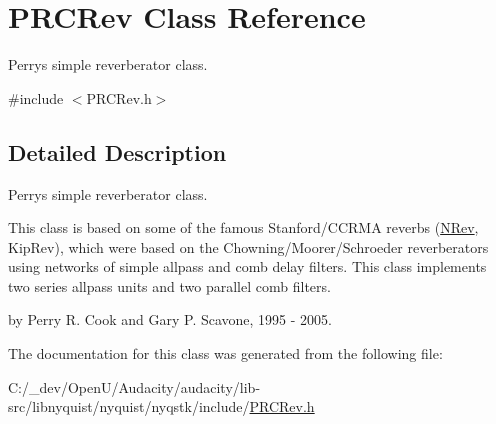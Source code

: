 \hypertarget{class_p_r_c_rev}{}\section{P\+R\+C\+Rev Class Reference}
\label{class_p_r_c_rev}


Perry\textquotesingle{}s simple reverberator class.  




{\ttfamily \#include $<$P\+R\+C\+Rev.\+h$>$}



\subsection{Detailed Description}
Perry\textquotesingle{}s simple reverberator class. 

This class is based on some of the famous Stanford/\+C\+C\+R\+MA reverbs (\hyperlink{class_n_rev}{N\+Rev}, Kip\+Rev), which were based on the Chowning/\+Moorer/\+Schroeder reverberators using networks of simple allpass and comb delay filters. This class implements two series allpass units and two parallel comb filters.

by Perry R. Cook and Gary P. Scavone, 1995 -\/ 2005. 

The documentation for this class was generated from the following file\+:\begin{DoxyCompactItemize}
\item 
C\+:/\+\_\+dev/\+Open\+U/\+Audacity/audacity/lib-\/src/libnyquist/nyquist/nyqstk/include/\hyperlink{_p_r_c_rev_8h}{P\+R\+C\+Rev.\+h}\end{DoxyCompactItemize}
